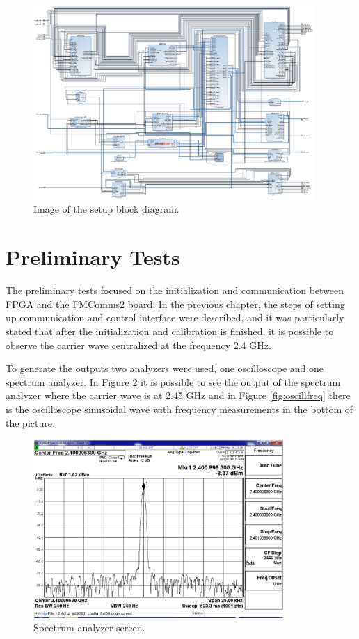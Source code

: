 \begin{figure}[htbp]
    \centering
    \includegraphics[width=0.95\textwidth]{./figures/setup_bd}
    \caption{ Image of the setup block diagram.
    \label{fig:setupbd}}
\end{figure}

\vfill
\clearpage

\section{Preliminary Tests}
\label{result:conf}

The preliminary tests focused on the initialization and communication between
FPGA and the FMComms2 board. In the previous chapter, the steps of setting up
communication and control interface were described, and it was particularly
stated that after the initialization and calibration is finished, it is possible
to observe the carrier wave centralized at the frequency 2.4 GHz.

To generate the outputs two analyzers were used, one oscilloscope and one
spectrum analyzer. In Figure \ref{fig:spec} it is possible to see the output of
the spectrum analyzer where the carrier wave is at 2.45 GHz and in Figure
\ref{fig:oscillfreq} there is the oscilloscope sinusoidal wave with frequency
measurements in the bottom of the picture.

\begin{figure}[htbp]
    \centering
    \includegraphics[width=0.85\textwidth]{./figures/spectrum_init}
    \caption{ Spectrum analyzer screen.
    \label{fig:spec}}
\end{figure}

